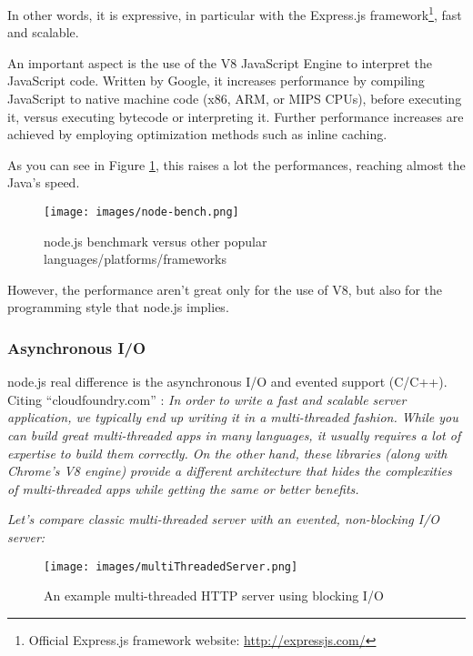 In other words, it is expressive, in particular with the Express.js framework\footnote{Official Express.js framework website: \url{http://expressjs.com/}}, fast and scalable. 

An important aspect is the use of the V8 JavaScript Engine to interpret the JavaScript code. Written by Google, it increases performance by compiling JavaScript to native machine code (x86, ARM, or MIPS CPUs)\cite{website:v8-intro}, before executing it, versus executing bytecode or interpreting it. Further performance increases are achieved by employing optimization methods such as inline caching.

As you can see in Figure \ref{fig:nodeBench}, this raises a lot the performances, reaching almost the Java's speed.

\begin{figure}[H]
\centering %
\texttt{[image: images/node-bench.png]}
\caption{node.js benchmark versus other popular languages/platforms/frameworks}
\label{fig:nodeBench}
\end{figure}

However, the performance aren't great only for the use of V8, but also for the programming style that node.js implies.

\subsubsection{Asynchronous I/O}
\label{sec:async}

node.js real difference is the asynchronous I/O and evented support (C/C++). Citing ``cloudfoundry.com'' \cite{website:cloudfoundry}: \textit{In order to write a fast and scalable server application, we typically end up writing it in a multi-threaded fashion. While you can build great multi-threaded apps in many languages, it usually requires a lot of expertise to build them correctly. On the other hand, these libraries (along with Chrome’s V8 engine) provide a different architecture that hides the complexities of multi-threaded apps while getting the same or better benefits.}

\textit{Let's compare classic multi-threaded server with an evented, non-blocking I/O server:}

\begin{figure}[H]
\centering %
\texttt{[image: images/multiThreadedServer.png]}
\caption{An example multi-threaded HTTP server using blocking I/O}
\label{fig:multiThreadedServer}
\end{figure}

